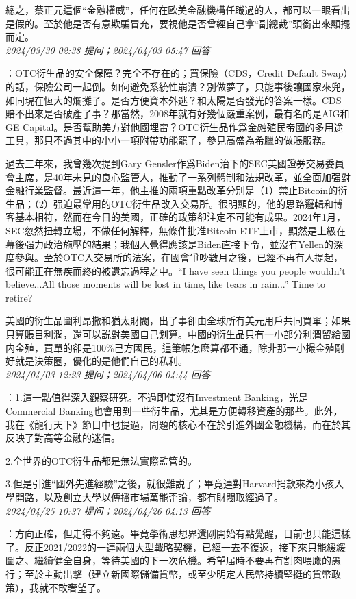 \documentclass[twocolumn]{ctexart}
\begin{document}
總之，蔡正元這個“金融權威”，任何在歐美金融機構任職過的人，都可以一眼看出是假的。至於他是否有意欺騙冒充，要視他是否曾經自己拿“副總裁”頭銜出來顯擺而定。
\\

\textit{\hfill\noindent\small 2024/03/30 02:38 提问；2024/04/03 05:47 回答}

：OTC衍生品的安全保障？完全不存在的；買保險（CDS，Credit Default Swap）的話，保險公司一起倒。如何避免系統性崩潰？別做夢了，只能事後讓國家來兜，如同現在恆大的爛攤子。是否方便資本外逃？和太陽是否發光的答案一樣。CDS賠不出來是否破產了事？那當然，2008年就有好幾個嚴重案例，最有名的是AIG和GE Capital。是否幫助美方對他國埋雷？OTC衍生品作爲金融殖民帝國的多用途工具，那只不過其中的小小一項附帶功能罷了，參見高盛為希臘的做賬服務。

過去三年來，我曾幾次提到Gary Gensler作爲Biden治下的SEC美國證券交易委員會主席，是40年未見的良心監管人，推動了一系列體制和法規改革，並全面加强對金融行業監督。最近這一年，他主推的兩項重點改革分別是（1）禁止Bitcoin的衍生品；（2）强迫最常用的OTC衍生品改入交易所。很明顯的，他的思路邏輯和博客基本相符，然而在今日的美國，正確的政策卻注定不可能有成果。2024年1月，SEC忽然扭轉立場，不做任何解釋，無條件批准Bitcoin ETF上市，顯然是上級在幕後强力政治施壓的結果；我個人覺得應該是Biden直接下令，並沒有Yellen的深度參與。至於OTC入交易所的法案，在國會爭吵數月之後，已經不再有人提起，很可能正在無疾而終的被遺忘過程之中。“I have seen things you people wouldn't believe...All those moments will be lost in time, like tears in rain...” Time to retire?

美國的衍生品圖利昂撒和猶太財閥，出了事卻由全球所有美元用戶共同買單；如果只算賬目利潤，還可以説對美國自己划算。中國的衍生品只有一小部分利潤留給國内金殖，買單的卻是100\%己方國民，這筆帳怎麽算都不通，除非那一小撮金殖剛好就是決策圈，優化的是他們自己的私利。
\\

\textit{\hfill\noindent\small 2024/04/03 12:23 提问；2024/04/06 04:44 回答}

：1.這一點值得深入觀察研究。不過即使沒有Investment Banking，光是Commercial Banking也會用到一些衍生品，尤其是方便轉移資產的那些。此外，我在《龍行天下》節目中也提過，問題的核心不在於引進外國金融機構，而在於其反映了對高等金融的迷信。

2.全世界的OTC衍生品都是無法實際監管的。

3.但是引進“國外先進經驗”之後，就很難説了；畢竟連對Harvard捐款來為小孩入學開路，以及創立大學以傳播市場萬能歪論，都有財閥取經過了。
\\

\textit{\hfill\noindent\small 2024/04/25 10:37 提问；2024/04/26 04:13 回答}

：方向正確，但走得不夠遠。畢竟學術思想界還剛開始有點覺醒，目前也只能這樣了。反正2021/2022的一連兩個大型戰略契機，已經一去不復返，接下來只能緩緩圖之、繼續健全自身，等待美國的下一次危機。希望届時不要再有割肉喂鷹的愚行；至於主動出擊（建立新國際儲備貨幣，或至少明定人民幣持續堅挺的貨幣政策），我就不敢奢望了。
\\


 
\end{document}
